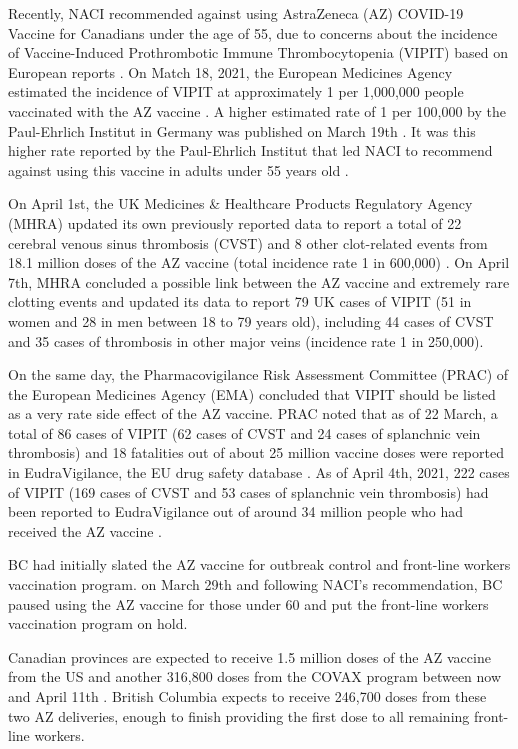 \documentclass[]{interact}
\theoremstyle{plain}%
\theoremstyle{definition}
\theoremstyle{remark}
\begin{document}
Recently, NACI recommended against using AstraZeneca (AZ) COVID-19
Vaccine for Canadians under the age of 55, due to concerns about the
incidence of Vaccine-Induced Prothrombotic Immune Thrombocytopenia
(VIPIT) based on European reports \citep{naci_naci_2021}. On Match 18,
2021, the European Medicines Agency estimated the incidence of VIPIT at
approximately 1 per 1,000,000 people vaccinated with the AZ vaccine
\citep{ema_covid-19_2021}. A higher estimated rate of 1 per 100,000 by
the Paul-Ehrlich Institut in Germany was published on March 19th
\citep{pei_covid-19_2021}. It was this higher rate reported by the
Paul-Ehrlich Institut that led NACI to recommend against using this
vaccine in adults under 55 years old \citep{naci_naci_2021}.

On April 1st, the UK Medicines \& Healthcare Products Regulatory Agency
(MHRA) updated its own previously reported data to report a total of 22
cerebral venous sinus thrombosis (CVST) and 8 other clot-related events
from 18.1 million doses of the AZ vaccine (total incidence rate 1 in
600,000) \citep{mhra_coronavirus_2021}. On April 7th, MHRA concluded a
possible link between the AZ vaccine and extremely rare clotting events
and updated its data to report 79 UK cases of VIPIT (51 in women and 28
in men between 18 to 79 years old), including 44 cases of CVST and 35
cases of thrombosis in other major veins (incidence rate 1 in
250,000)\citep{mhra_mhra_2021}.

On the same day, the Pharmacovigilance Risk Assessment Committee (PRAC)
of the European Medicines Agency (EMA) concluded that VIPIT should be
listed as a very rate side effect of the AZ vaccine. PRAC noted that as
of 22 March, a total of 86 cases of VIPIT (62 cases of CVST and 24 cases
of splanchnic vein thrombosis) and 18 fatalities out of about 25 million
vaccine doses were reported in EudraVigilance, the EU drug safety
database \citep{ema_astrazenecas_2021}. As of April 4th, 2021, 222 cases
of VIPIT (169 cases of CVST and 53 cases of splanchnic vein thrombosis)
had been reported to EudraVigilance out of around 34 million people who
had received the AZ vaccine \citep{ema_astrazenecas_2021}.

BC had initially slated the AZ vaccine for outbreak control and
front-line workers vaccination program. on March 29th and following
NACI's recommendation, BC paused using the AZ vaccine for those under 60
and put the front-line workers vaccination program on hold.

Canadian provinces are expected to receive 1.5 million doses of the AZ
vaccine from the US and another 316,800 doses from the COVAX program
between now and April 11th \citep{government_of_canada_vaccines_2021}.
British Columbia expects to receive 246,700 doses from these two AZ
deliveries, enough to finish providing the first dose to all remaining
front-line workers.
\end{document}
